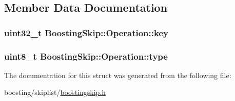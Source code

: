 \subsection{Member Data Documentation}
\hypertarget{structBoostingSkip_1_1Operation_aa498d6cb2c346d0b1470149617afc7d3}{
\subsubsection[{key}]{\setlength{\rightskip}{0pt plus 5cm}uint32\-\_\-t Boosting\-Skip\-::\-Operation\-::key}}\label{structBoostingSkip_1_1Operation_aa498d6cb2c346d0b1470149617afc7d3}
\hypertarget{structBoostingSkip_1_1Operation_a665f97528e64b59bdd5fc05e734c87e9}{
\subsubsection[{type}]{\setlength{\rightskip}{0pt plus 5cm}uint8\-\_\-t Boosting\-Skip\-::\-Operation\-::type}}\label{structBoostingSkip_1_1Operation_a665f97528e64b59bdd5fc05e734c87e9}


The documentation for this struct was generated from the following file\-:\begin{DoxyCompactItemize}
\item 
boosting/skiplist/\hyperlink{boostingskip_8h}{boostingskip.\-h}\end{DoxyCompactItemize}
